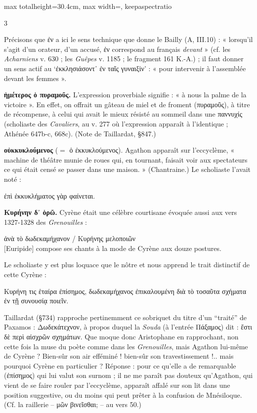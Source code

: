 \documentclass[11pt,twoside]{book}
\newcommand{\italique}[1]{\textit{#1}}
\newcommand{\citComm}[1]{\begin{quoting}[vskip=0.4pt,leftmargin=0.7em,rightmargin=0.2em]#1\end{quoting}}
\newcommand{\francais}[1]{{\policeFr #1}}
\begin{document}
\begin{adjustbox}{max totalheight=30.4cm, max width=\textwidth, keepaspectratio}
\begin{minipage}{\textwidth}
{\begin{multicols}{3}
\par\vspace{1.5pt}
\noindent Précisons que ἐν a ici le sens technique que donne le Bailly (A, III.10) : « lorsqu'il s'agit d'un orateur, d'un accusé, ἐν correspond au français \italique{devant} » (cf. les \italique{Acharniens} v. 630 ; les \italique{Guêpes} v. 1185 ; le fragment 161 K.-A.) ; il faut donner un sens actif au `ἐκκλησιάσοντ᾽ ἐν ταῖς γυναιξὶν' : « pour intervenir à l'assemblée devant les femmes ».
\par\vspace{1.5pt}
 \textbf{ἡμέτερος ὁ πυραμοῦς.} L'expression proverbiale signifie : « à nous la palme de la victoire ». En effet, on offrait un gâteau de miel et de froment (πυραμοῦς), à titre de récompense, à celui qui avait le mieux résisté au sommeil dans une παννυχίς (scholiaste des \italique{Cavaliers}, au v. 277 où l'expression apparaît à l'identique ; Athénée 647b-c, 668c). (Note de Taillardat, §847.)
\par\vspace{1.5pt}
 \textbf{οὑκκυκλούμενος} ($=$ ὁ ἐκκυκλούμενος). Agathon apparaît sur l'eccyclème, « machine de théâtre munie de roues qui, en tournant, faisait voir aux spectateurs ce qui était censé se passer dans une maison. » (Chantraine.)  Le scholiaste l'avait noté :
\citComm{ἐπὶ ἐκκυκλήματος γὰρ φαίνεται.}
\par\vspace{1.5pt}
 \textbf{Κυρήνην δ᾽ ὁρῶ.} Cyrène était une célèbre courtisane évoquée aussi aux vers 1327-1328 des \italique{Grenouilles} :
\citComm{ἀνὰ τὸ δωδεκαμήχανον / Κυρήνης μελοποιῶν\\
\francais{$[$Euripide$]$ compose ses chants à la mode de Cyrène aux douze postures.}}
\par\vspace{1.5pt}
\noindent Le scholiaste y est plus loquace que le nôtre et nous apprend le trait distinctif de cette Cyrène :
\citComm{Κυρήνη τις ἑταίρα ἐπίσημος, δωδεκαμήχανος ἐπικαλουμένη διὰ τὸ τοσαῦτα σχήματα ἐν τῇ συνουσίᾳ ποιεῖν.}
\par\vspace{1.5pt}
\noindent Taillardat (§734) rapproche pertinemment ce sobriquet du titre d'un ``traité'' de Paxamos : Δωδεκάτεχνον, à propos duquel la \italique{Souda} (à l'entrée Πάξαμος) dit : ἔστι δὲ περὶ αἰσχρῶν σχημάτων. Que moque donc Aristophane en rapprochant, non cette fois la muse du poète comme dans les \italique{Grenouilles}, mais Agathon lui-même de Cyrène ? Bien-sûr son air efféminé ! bien-sûr son travestissement !.. mais pourquoi Cyrène en particulier ? Réponse : pour ce qu'elle a de remarquable (ἐπίσημος) qui lui valut son surnom ; il ne me paraît pas douteux qu'Agathon, qui vient de se faire rouler par l'eccyclème, apparaît affalé sur son lit dans une position suggestive, ou du moins qui peut prêter à la confusion de Mnésiloque. (Cf. la raillerie -- μῶν βινεῖσθαι; -- au vers 50.)

\end{multicols}}
\end{minipage}
\end{adjustbox}
\end{document}
